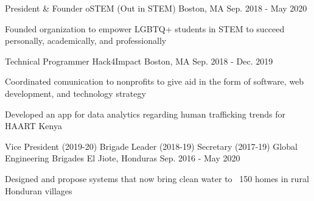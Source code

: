 


\begin{cventries}


\cventry
{President \& Founder} %
{oSTEM (Out in STEM)} %
{Boston, MA} %
{Sep. 2018 - May 2020} %
{ %
\begin{cvitems}
\item {Founded organization to empower LGBTQ+ students in STEM to succeed personally, academically, and professionally}
\end{cvitems}
}


\cventry
{Technical Programmer} %
{Hack4Impact} %
{Boston, MA} %
{Sep. 2018 - Dec. 2019} %
{ %
\begin{cvitems}
\item {Coordinated comunication to nonprofits to give aid in the form of software, web development, and technology strategy}
\item {Developed an app for data analytics regarding human trafficking trends for HAART Kenya}
\end{cvitems}
}


\cventry
{Vice President (2019-20) {\bullet} Brigade Leader (2018-19) {\bullet} Secretary (2017-19)} %
{Global Engineering Brigades} %
{El Jiote, Honduras} %
{Sep. 2016 - May 2020} %
{ %
\begin{cvitems}
\item {Designed and propose systems that now bring clean water to ~150 homes in rural Honduran villages}
\end{cvitems}
}


\end{cventries}
